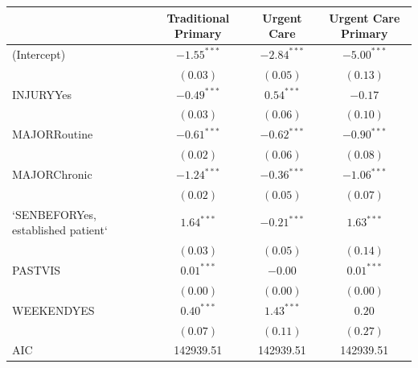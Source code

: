 \documentclass[12pt,twoside]{reedthesis}
\begin{document}
  \begin{table}
  \begin{center}
  \begin{footnotesize}
  \begin{tabular}{l c c c }
  \hline
   & Traditional Primary & Urgent Care & Urgent Care Primary \\
  \hline
  (Intercept)                        & $\mathbf{-1.55}^{***}$ & $\mathbf{-2.84}^{***}$ & $\mathbf{-5.00}^{***}$ \\
                                     & $(0.03)$               & $(0.05)$               & $(0.13)$               \\
  INJURYYes                          & $\mathbf{-0.49}^{***}$ & $\mathbf{0.54}^{***}$  & $-0.17$                \\
                                     & $(0.03)$               & $(0.06)$               & $(0.10)$               \\
  MAJORRoutine                       & $\mathbf{-0.61}^{***}$ & $\mathbf{-0.62}^{***}$ & $\mathbf{-0.90}^{***}$ \\
                                     & $(0.02)$               & $(0.06)$               & $(0.08)$               \\
  MAJORChronic                       & $\mathbf{-1.24}^{***}$ & $\mathbf{-0.36}^{***}$ & $\mathbf{-1.06}^{***}$ \\
                                     & $(0.02)$               & $(0.05)$               & $(0.07)$               \\
  `SENBEFORYes, established patient` & $\mathbf{1.64}^{***}$  & $\mathbf{-0.21}^{***}$ & $\mathbf{1.63}^{***}$  \\
                                     & $(0.03)$               & $(0.05)$               & $(0.14)$               \\
  PASTVIS                            & $\mathbf{0.01}^{***}$  & $-0.00$                & $\mathbf{0.01}^{***}$  \\
                                     & $(0.00)$               & $(0.00)$               & $(0.00)$               \\
  WEEKENDYES                         & $\mathbf{0.40}^{***}$  & $\mathbf{1.43}^{***}$  & $0.20$                 \\
                                     & $(0.07)$               & $(0.11)$               & $(0.27)$               \\
  \hline
  AIC                                & 142939.51              & 142939.51              & 142939.51              \\

\end{tabular}
\end{footnotesize}
\end{center}
\end{table}
\end{document}
